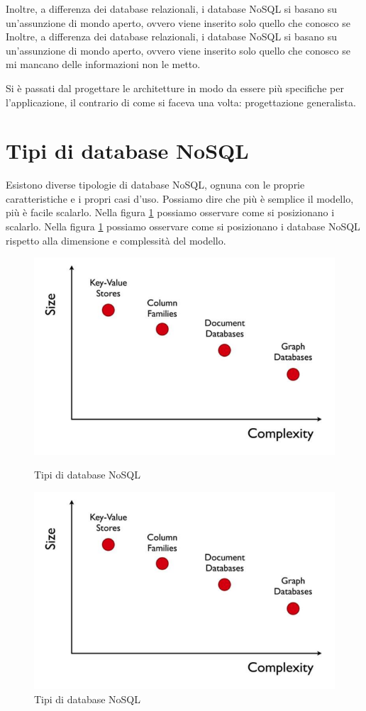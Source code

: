 Inoltre, a differenza dei database relazionali, i database NoSQL si basano su
un'assunzione di mondo aperto, ovvero viene inserito solo quello che conosco se
Inoltre, a differenza dei database relazionali, i database NoSQL si basano su
un'assunzione di mondo aperto, ovvero viene inserito solo quello che conosco se
mi mancano delle informazioni non le metto.

Si è passati dal progettare le architetture in modo da essere più specifiche
per l'applicazione, il contrario di come si faceva una volta: progettazione generalista.
\section{Tipi di database NoSQL}
Esistono diverse tipologie di database NoSQL, ognuna con le proprie caratteristiche
e i propri casi d'uso. Possiamo dire che più è semplice il modello, più è facile
scalarlo. Nella figura \ref{fig:tipi_nosql} possiamo osservare come si posizionano i
scalarlo. Nella figura \ref{fig:tipi_nosql} possiamo osservare come si posizionano i
database NoSQL rispetto alla dimensione e complessità del modello.
\begin{figure}[!ht]
      \centering
      \includegraphics[scale=0.5]{./img/nosql/tipi_nosql.png}
      \caption{Tipi di database NoSQL}
      \label{fig:tipi_nosql}
      \centering
      \includegraphics[scale=0.5]{./img/nosql/tipi_nosql.png}
      \caption{Tipi di database NoSQL}
      \label{fig:tipi_nosql}
\end{figure}

